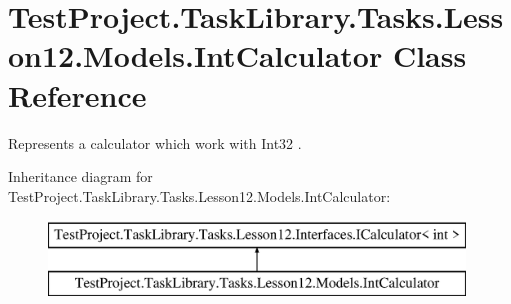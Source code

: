 \hypertarget{class_test_project_1_1_task_library_1_1_tasks_1_1_lesson12_1_1_models_1_1_int_calculator}{}\section{Test\+Project.\+Task\+Library.\+Tasks.\+Lesson12.\+Models.\+Int\+Calculator Class Reference}
\label{class_test_project_1_1_task_library_1_1_tasks_1_1_lesson12_1_1_models_1_1_int_calculator}


Represents a calculator which work with Int32 .  


Inheritance diagram for Test\+Project.\+Task\+Library.\+Tasks.\+Lesson12.\+Models.\+Int\+Calculator\+:\begin{figure}[H]
\begin{center}
\leavevmode
\includegraphics[height=2.000000cm]{class_test_project_1_1_task_library_1_1_tasks_1_1_lesson12_1_1_models_1_1_int_calculator}
\end{center}
\end{figure}
